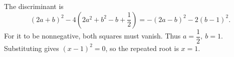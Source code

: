 The discriminant is
\[
(2a+b)^2-4\left(2a^2+b^2-b+\dfrac{1}{2}\right)
=-(2a-b)^2-2(b-1)^2.
\]
For it to be nonnegative, both squares must vanish. Thus $\boxed{a=\dfrac{1}{2},\ b=1}$. Substituting gives $(x-1)^2=0$, so the repeated root is $\boxed{x=1}$.
